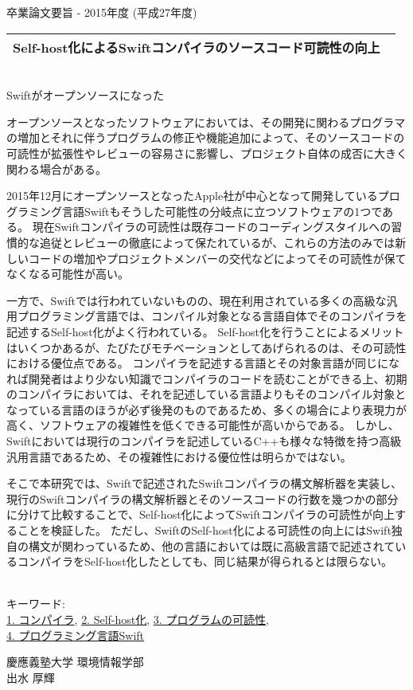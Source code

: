 卒業論文要旨 - 2015年度 (平成27年度)
\begin{center}
\begin{large}
\begin{tabular}{|M{0.97\linewidth}|}
    \hline
    Self-host化によるSwiftコンパイラのソースコード可読性の向上\\
    \hline
\end{tabular}
\end{large}
\end{center}

~ \\

Swiftがオープンソースになった

オープンソースとなったソフトウェアにおいては、その開発に関わるプログラマの増加とそれに伴うプログラムの修正や機能追加によって、そのソースコードの可読性が拡張性やレビューの容易さに影響し、プロジェクト自体の成否に大きく関わる場合がある。

2015年12月にオープンソースとなったApple社が中心となって開発しているプログラミング言語Swiftもそうした可能性の分岐点に立つソフトウェアの1つである。
現在Swiftコンパイラの可読性は既存コードのコーディングスタイルへの習慣的な追従とレビューの徹底によって保たれているが、これらの方法のみでは新しいコードの増加やプロジェクトメンバーの交代などによってその可読性が保てなくなる可能性が高い。

一方で、Swiftでは行われていないものの、現在利用されている多くの高級な汎用プログラミング言語では、コンパイル対象となる言語自体でそのコンパイラを記述するSelf-host化がよく行われている。
Self-host化を行うことによるメリットはいくつかあるが、たびたびモチベーションとしてあげられるのは、その可読性における優位点である。
コンパイラを記述する言語とその対象言語が同じになれば開発者はより少ない知識でコンパイラのコードを読むことができる上、初期のコンパイラにおいては、それを記述している言語よりもそのコンパイル対象となっている言語のほうが必ず後発のものであるため、多くの場合により表現力が高く、ソフトウェアの複雑性を低くできる可能性が高いからである。
しかし、Swiftにおいては現行のコンパイラを記述しているC++も様々な特徴を持つ高級汎用言語であるため、その複雑性における優位性は明らかではない。

そこで本研究では、Swiftで記述されたSwiftコンパイラの構文解析器を実装し、現行のSwiftコンパイラの構文解析器とそのソースコードの行数を幾つかの部分に分けて比較することで、Self-host化によってSwiftコンパイラの可読性が向上することを検証した。
ただし、SwiftのSelf-host化による可読性の向上にはSwift独自の構文が関わっているため、他の言語においては既に高級言語で記述されているコンパイラをSelf-host化したとしても、同じ結果が得られるとは限らない。

~ \\
キーワード:\\
\underline{1. コンパイラ},
\underline{2. Self-host化},
\underline{3. プログラムの可読性},\\
\underline{4. プログラミング言語Swift}
\begin{flushright}
慶應義塾大学 環境情報学部\\
出水 厚輝
\end{flushright}
